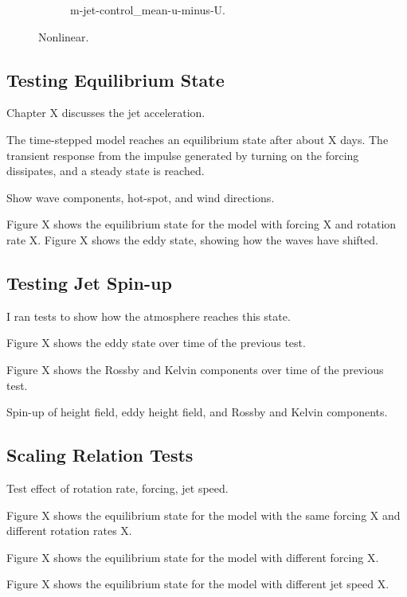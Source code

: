 \begin{figure}
\begin{subfigure}[b]{0.33\textwidth}
    \caption{m-jet-control_mean-u-minus-U.}
    \label{fig:m-jet-control_mean-u-minus-U}
  \end{subfigure}
  \caption{Nonlinear.}
  \label{fig:m-jet-control_mean-u_figure}
\end{figure}



\subsection*{Testing Equilibrium State}

Chapter X discusses the jet acceleration.

The time-stepped model reaches an equilibrium state after about X days. The transient response from the impulse generated by turning on the forcing dissipates, and a steady state is reached.

Show wave components, hot-spot, and wind directions.

Figure X shows the equilibrium state for the model with forcing X and rotation rate X. Figure X shows the eddy state, showing how the waves have shifted.


\subsection*{Testing Jet Spin-up}

I ran tests to show how the atmosphere reaches this state.

Figure X shows the eddy state over time of the previous test.

Figure X shows the Rossby and Kelvin components over time of the previous test.

Spin-up of height field, eddy height field, and Rossby and Kelvin components.


\subsection*{Scaling Relation Tests}

Test effect of rotation rate, forcing, jet speed.

Figure X shows the equilibrium state for the model with the same forcing X and different rotation rates X.

Figure X shows the equilibrium state for the model with different forcing X.

Figure X shows the equilibrium state for the model with different jet speed X.

